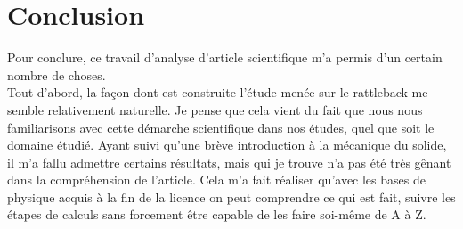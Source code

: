 \documentclass[12pt,a4paper]{article}
\begin{document}
	\section{Conclusion}
	Pour conclure, ce travail d'analyse d'article scientifique m'a permis d'un certain nombre de choses.\\
	
	Tout d'abord, la façon dont est construite l'étude menée sur le rattleback me semble relativement naturelle. Je pense que cela vient du fait que nous nous familiarisons avec cette démarche scientifique dans nos études, quel que soit le domaine étudié. Ayant suivi qu'une brève introduction à la mécanique du solide, il m'a fallu admettre certains résultats, mais qui je trouve n'a pas été très gênant dans la compréhension de l'article. Cela m'a fait réaliser qu'avec les bases de physique acquis à la fin de la licence on peut comprendre ce qui est fait, suivre les étapes de calculs sans forcement être capable de les faire soi-même de A à Z.
	
\end{document}
